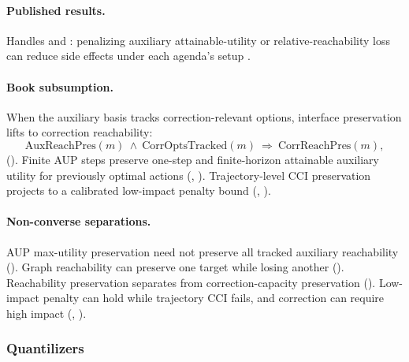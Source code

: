 \paragraph{Published results.}
Handles  and : penalizing auxiliary attainable-utility or relative-reachability loss can reduce side effects under each agenda's setup \autocite{turner2019aup,krakovna2018relative}.

\paragraph{Book subsumption.}
When the auxiliary basis tracks correction-relevant options, interface preservation lifts to correction reachability:
\begin{equation}
\label{appi:eq:aup-interface}
\mathrm{AuxReachPres}(m)\ \wedge\ \mathrm{CorrOptsTracked}(m)
\ \Rightarrow\ \mathrm{CorrReachPres}(m),
\end{equation}
().
Finite AUP steps preserve one-step and finite-horizon attainable auxiliary utility for previously optimal actions (, ).
Trajectory-level \(\mathrm{CCI}\) preservation projects to a calibrated low-impact penalty bound (, ).

\paragraph{Non-converse separations.}
AUP max-utility preservation need not preserve all tracked auxiliary reachability ().
Graph reachability can preserve one target while losing another ().
Reachability preservation separates from correction-capacity preservation ().
Low-impact penalty can hold while trajectory \(\mathrm{CCI}\) fails, and correction can require high impact (, ).

\subsubsection{Quantilizers \autocite{taylor2015quantilizers}}
\label{sec:appi-field-quantil}

